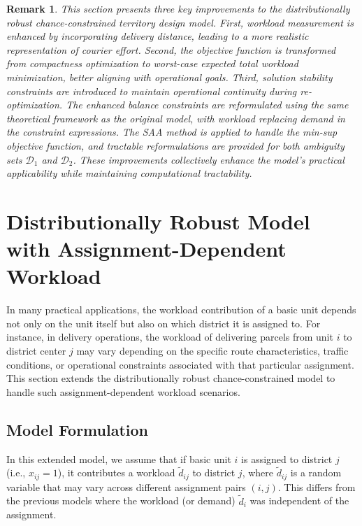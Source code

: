 \documentclass[preprint,12pt,authoryear]{elsarticle}
\newtheorem{remark}{Remark}
\begin{document}
\begin{remark}
This section presents three key improvements to the distributionally robust chance-constrained territory design model. First, workload measurement is enhanced by incorporating delivery distance, leading to a more realistic representation of courier effort. Second, the objective function is transformed from compactness optimization to worst-case expected total workload minimization, better aligning with operational goals. Third, solution stability constraints are introduced to maintain operational continuity during re-optimization. The enhanced balance constraints are reformulated using the same theoretical framework as the original model, with workload replacing demand in the constraint expressions. The SAA method is applied to handle the min-sup objective function, and tractable reformulations are provided for both ambiguity sets $\mathcal{D}_1$ and $\mathcal{D}_2$. These improvements collectively enhance the model's practical applicability while maintaining computational tractability.
\end{remark}

\section{Distributionally Robust Model with Assignment-Dependent Workload}
\label{sec:assignment_dependent}

In many practical applications, the workload contribution of a basic unit depends not only on the unit itself but also on which district it is assigned to. For instance, in delivery operations, the workload of delivering parcels from unit $i$ to district center $j$ may vary depending on the specific route characteristics, traffic conditions, or operational constraints associated with that particular assignment. This section extends the distributionally robust chance-constrained model to handle such assignment-dependent workload scenarios.

\subsection{Model Formulation}

In this extended model, we assume that if basic unit $i$ is assigned to district $j$ (i.e., $x_{ij} = 1$), it contributes a workload $\tilde{d}_{ij}$ to district $j$, where $\tilde{d}_{ij}$ is a random variable that may vary across different assignment pairs $(i,j)$. This differs from the previous models where the workload (or demand) $\tilde{d}_i$ was independent of the assignment.
\end{document}

